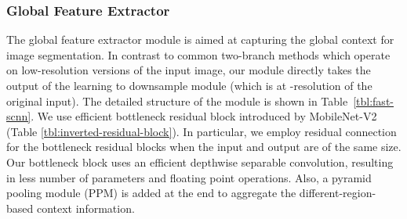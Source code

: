 \documentclass[10pt,twocolumn,letterpaper]{article}
\begin{document}
\subsubsection{Global Feature Extractor}
\begin{table}[t]
\begin{center}
\end{center}
\caption{The \textit{bottleneck residual block} transfers the input from  to  channels with expansion factor . Note, the last pointwise convolution does not use non-linearity . The input is of height  and width , and x/ represents kernel size and stride of the layer.}
\label{tbl:inverted-residual-block}
\end{table}
The global feature extractor module is aimed at capturing the global context for image segmentation. In contrast to common two-branch methods which operate on low-resolution versions of the input image, our module directly takes the output of the learning to downsample module (which is at -resolution of the original input). The detailed structure of the module is shown in Table~\ref{tbl:fast-scnn}. We use efficient bottleneck residual block introduced by MobileNet-V2 \cite{inverted-res-bottlenecks-sandler2018} (Table \ref{tbl:inverted-residual-block}). In particular, we employ residual connection for the bottleneck residual blocks when the input and output are of the same size. Our bottleneck block uses an efficient depthwise separable convolution, resulting in less number of parameters and floating point operations. Also, a pyramid pooling module (PPM) \cite{pspnet-zhao2017a} is added at the end to aggregate the different-region-based context information.
\end{document}
